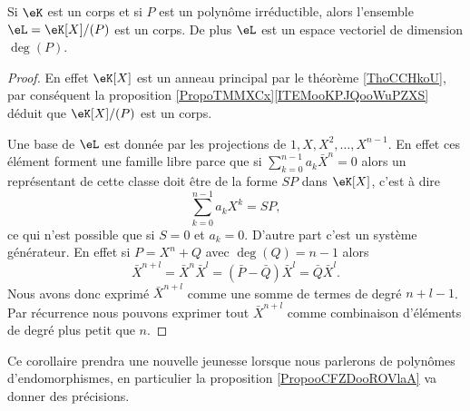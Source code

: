 \begin{corollary}       \label{CorsLGiEN}
    Si \( \eK\) est un corps et si \( P\) est un polynôme irréductible, alors l'ensemble \( \eL=\eK[X]/(P)\) est un corps. De plus \( \eL\) est un espace vectoriel de dimension \( \deg(P)\).
\end{corollary}

\begin{proof}
    En effet \( \eK[X]\) est un anneau principal par le théorème \ref{ThoCCHkoU}, par conséquent la proposition \ref{PropoTMMXCx}\ref{ITEMooKPJQooWuPZXS} déduit que \( \eK[X]/(P)\) est un corps.

    Une base de \( \eL\) est donnée par les projections de \( 1,X,X^2,\ldots, X^{n-1}\). En effet ces élément forment une famille libre parce que si \( \sum_{k=0}^{n-1}a_k\bar X^n=0\) alors un représentant de cette classe doit être de la forme \( SP\) dans \( \eK[X]\), c'est à dire
    \begin{equation}
        \sum_{k=0}^{n-1}a_kX^k=SP,
    \end{equation}
    ce qui n'est possible que si \( S=0\) et \( a_k=0\). D'autre part c'est un système générateur. En effet si \( P=X^n+Q\) avec \( \deg(Q)=n-1\) alors
    \begin{equation}
        \bar X^{n+l}=\bar X^n\bar X^l=(\bar P-\bar Q)\bar X^l=\bar Q\bar X^l.
    \end{equation}
    Nous avons donc exprimé \( \bar X^{n+l}\) comme une somme de termes de degré \( n+l-1\). Par récurrence nous pouvons exprimer tout \( \bar X^{n+l}\) comme combinaison d'éléments de degré plus petit que \( n\).
\end{proof}

\begin{normaltext}
    Ce corollaire prendra une nouvelle jeunesse lorsque nous parlerons de polynômes d'endomorphismes, en particulier la proposition \ref{PropooCFZDooROVlaA} va donner des précisions.
\end{normaltext}

